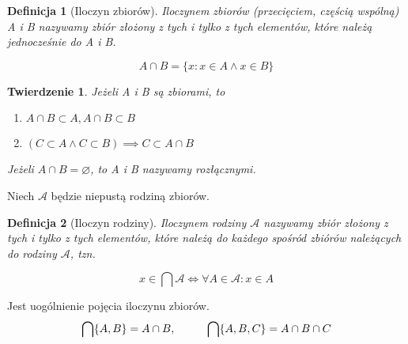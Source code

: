 \documentclass[a5paper,8pt]{article}
\theoremstyle{mythmstyle}
\newtheorem{definition}{Definicja}[section]
\newtheorem{theorem}{Twierdzenie}[section]
\newcommand\tab[1][1cm]{\hspace*{#1}}
\begin{document}
        \begin{definition}[Iloczyn zbiorów]
            Iloczynem zbiorów (przecięciem, częścią wspólną) A i B nazywamy zbiór złożony z tych i tylko z tych elementów, które należą jednocześnie do A i B.

            \begin{equation*}
                A \cap B = \{ x : x \in A \wedge x \in B \}
            \end{equation*}

        \end{definition}

        \begin{theorem}
            Jeżeli A i B są zbiorami, to

            \begin{enumerate}
                \item $ A \cap B \subset A, A \cap B \subset B $

                \item $ ( C \subset A \wedge C \subset B ) \implies C \subset A \cap B $
            \end{enumerate}
            
            Jeżeli $ A \cap B = \varnothing $, to A i B nazywamy rozłącznymi.                 
        \end{theorem}


        Niech $ \mathcal{A} $ będzie niepustą rodziną zbiorów.

        \begin{definition}[Iloczyn rodziny]
            Iloczynem rodziny $ \mathcal{A} $ nazywamy zbiór złożony z tych i tylko z tych
            elementów, które należą do każdego spośród zbiórów należących do rodziny $ \mathcal{A} $,
            tzn.

            \begin{equation*}
                x \in \bigcap \mathcal{A} \iff \forall A \in \mathcal{A} : x \in A
            \end{equation*}
        \end{definition}

        Jest uogólnienie pojęcia iloczynu zbiorów.
        \begin{equation*}
            \bigcap \{ A, B \} = A \cap B, \tab \bigcap \{ A, B, C \} = A \cap B \cap C
        \end{equation*}

        \pagebreak
        
\end{document}
